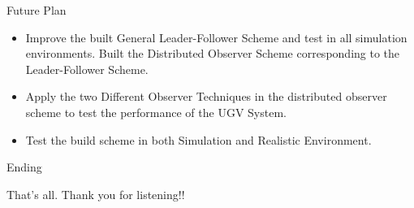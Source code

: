 \label{sec:futureplan}
\begin{frame}[label={page:futureplangraph}]{Future Plan}

\begin{itemize}
    \item Improve the built General Leader-Follower Scheme and test in all simulation environments.  Built the Distributed Observer Scheme corresponding to the Leader-Follower Scheme. \vskip 10mm
    \item Apply the two Different Observer Techniques in the distributed observer scheme to test the performance of the UGV System. \vskip 10mm
    \item Test the build scheme in both Simulation and Realistic Environment.
\end{itemize}
\end{frame}

\begin{frame}{Ending}
    \begin{center}
        That's all. Thank you for listening!!
    \end{center}   
\end{frame}

